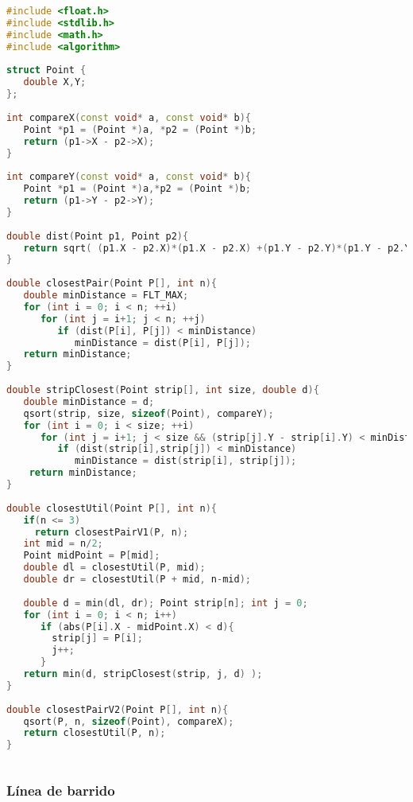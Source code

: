 \begin{lstlisting}[language=C++]
#include <float.h>
#include <stdlib.h>
#include <math.h>
#include <algorithm>
	
struct Point {
   double X,Y;
};
	
int compareX(const void* a, const void* b){
   Point *p1 = (Point *)a, *p2 = (Point *)b;
   return (p1->X - p2->X);
}
	
int compareY(const void* a, const void* b){
   Point *p1 = (Point *)a,*p2 = (Point *)b;
   return (p1->Y - p2->Y);
}
	
double dist(Point p1, Point p2){
   return sqrt( (p1.X - p2.X)*(p1.X - p2.X) +(p1.Y - p2.Y)*(p1.Y - p2.Y));
}
	
double closestPair(Point P[], int n){
   double minDistance = FLT_MAX;
   for (int i = 0; i < n; ++i)
      for (int j = i+1; j < n; ++j)
         if (dist(P[i], P[j]) < minDistance)
            minDistance = dist(P[i], P[j]);
   return minDistance;
}
	
double stripClosest(Point strip[], int size, double d){
   double minDistance = d; 
   qsort(strip, size, sizeof(Point), compareY);
   for (int i = 0; i < size; ++i)
      for (int j = i+1; j < size && (strip[j].Y - strip[i].Y) < minDistance; ++j)
         if (dist(strip[i],strip[j]) < minDistance)
            minDistance = dist(strip[i], strip[j]);
    return minDistance;
}
	
double closestUtil(Point P[], int n){
   if(n <= 3)
     return closestPairV1(P, n);
   int mid = n/2;
   Point midPoint = P[mid];
   double dl = closestUtil(P, mid);
   double dr = closestUtil(P + mid, n-mid);
		
   double d = min(dl, dr); Point strip[n]; int j = 0;
   for (int i = 0; i < n; i++)
      if (abs(P[i].X - midPoint.X) < d){
      	strip[j] = P[i];
        j++;
      }
   return min(d, stripClosest(strip, j, d) );
}
	
double closestPairV2(Point P[], int n){
   qsort(P, n, sizeof(Point), compareX);
   return closestUtil(P, n);
}
	
\end{lstlisting}

\subsubsection{Línea de barrido}

